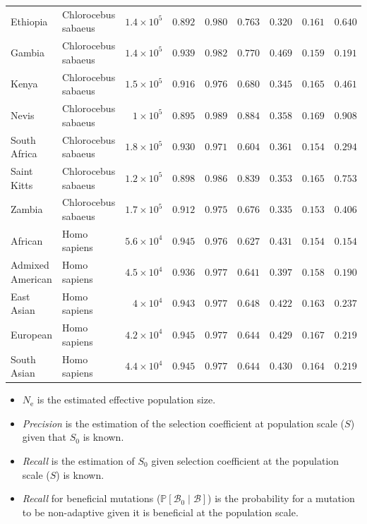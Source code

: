 \documentclass{article}
\newcommand{\Ne}{N_{\text{e}}}
\newcommand{\proba}{\mathbb{P}}
\newcommand{\Sphy}{S_{0}}
\newcommand{\SphyBen}{\mathcal{B}_0}
\newcommand{\given}{\mid}
\newcommand{\Spop}{S}
\newcommand{\SpopBen}{\mathcal{B}}
\begin{document}
\begin{center}
\begin{adjustbox}{width=\textwidth}
\begin{tabular}{||l|l|r||r|r||r|r||r|r||}
                \rowcolor{LIGHTGREY} Ethiopia & Chlorocebus sabaeus & $1.4\times 10^{5}$ & $ 0.892$ & $ 0.980$ & $ 0.763$ & $ 0.320$ & $ 0.161$ & $ 0.640$ \\
                \rowcolor{LIGHTGREY} Gambia & Chlorocebus sabaeus & $1.4\times 10^{5}$ & $ 0.939$ & $ 0.982$ & $ 0.770$ & $ 0.469$ & $ 0.159$ & $ 0.191$ \\
                \rowcolor{LIGHTGREY} Kenya & Chlorocebus sabaeus & $1.5\times 10^{5}$ & $ 0.916$ & $ 0.976$ & $ 0.680$ & $ 0.345$ & $ 0.165$ & $ 0.461$ \\
                \rowcolor{LIGHTGREY} Nevis & Chlorocebus sabaeus & $ 1\times 10^{5}$ & $ 0.895$ & $ 0.989$ & $ 0.884$ & $ 0.358$ & $ 0.169$ & $ 0.908$ \\
                \rowcolor{LIGHTGREY} South Africa & Chlorocebus sabaeus & $1.8\times 10^{5}$ & $ 0.930$ & $ 0.971$ & $ 0.604$ & $ 0.361$ & $ 0.154$ & $ 0.294$ \\
                \rowcolor{LIGHTGREY} Saint Kitts & Chlorocebus sabaeus & $1.2\times 10^{5}$ & $ 0.898$ & $ 0.986$ & $ 0.839$ & $ 0.353$ & $ 0.165$ & $ 0.753$ \\
                \rowcolor{LIGHTGREY} Zambia & Chlorocebus sabaeus & $1.7\times 10^{5}$ & $ 0.912$ & $ 0.975$ & $ 0.676$ & $ 0.335$ & $ 0.153$ & $ 0.406$ \\
                African & Homo sapiens & $5.6\times 10^{4}$ & $ 0.945$ & $ 0.976$ & $ 0.627$ & $ 0.431$ & $ 0.154$ & $ 0.154$ \\
                Admixed American & Homo sapiens & $4.5\times 10^{4}$ & $ 0.936$ & $ 0.977$ & $ 0.641$ & $ 0.397$ & $ 0.158$ & $ 0.190$ \\
                East Asian & Homo sapiens & $ 4\times 10^{4}$ & $ 0.943$ & $ 0.977$ & $ 0.648$ & $ 0.422$ & $ 0.163$ & $ 0.237$ \\
                European & Homo sapiens & $4.2\times 10^{4}$ & $ 0.945$ & $ 0.977$ & $ 0.644$ & $ 0.429$ & $ 0.167$ & $ 0.219$ \\
                South Asian & Homo sapiens & $4.4\times 10^{4}$ & $ 0.945$ & $ 0.977$ & $ 0.644$ & $ 0.430$ & $ 0.164$ & $ 0.219$ \\
                \bottomrule
            \end{tabular}
        \end{adjustbox}
    \end{center}
    \begin{itemize}
        \item $\Ne$ is the estimated effective population size.
        \item \textit{Precision} is the estimation of the selection coefficient at population scale ($\Spop$) given that $\Sphy$ is known.
        \item \textit{Recall} is the estimation of $\Sphy$ given selection coefficient at the population scale ($\Spop$) is known.
        \item \textit{Recall} for beneficial mutations ($\proba [\SphyBen \given \SpopBen]$) is the probability for a mutation to be non-adaptive given it is beneficial at the population scale.
    \end{itemize}
\end{document}
